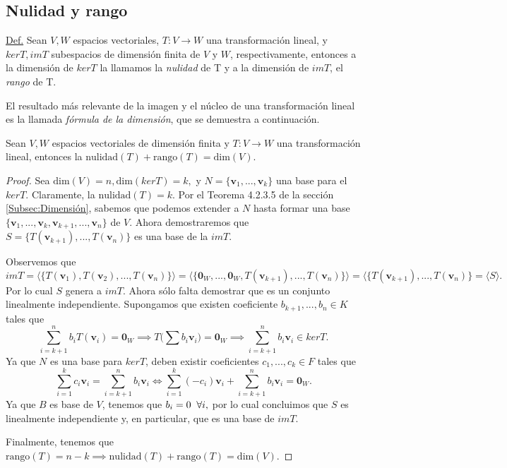 \documentclass[12pt]{article}
\newenvironment{teorema}[2][Teorema]{\begin{trivlist}
\item[\hskip \labelsep {\bfseries #1}\hskip \labelsep {\bfseries #2.}]}{\end{trivlist}}
\begin{document}
\subsection{Nulidad y rango}

\begin{tcolorbox}
    \underline{Def.} Sean $V,W$ espacios vectoriales, $T:V\to W$ una transformación lineal, y $kerT, imT$ subespacios de dimensión finita de $V$ y $W$, respectivamente, entonces a la dimensión de $kerT$ la llamamos la \emph{nulidad} de T y a la dimensión de $imT$, el \emph{rango} de T. 
\end{tcolorbox}

El resultado más relevante de la imagen y el núcleo de una transformación lineal es la llamada \emph{fórmula de la dimensión}, que se demuestra a continuación.

\begin{teorema} {5.3.1}
    Sean $V,W$ espacios vectoriales de dimensión finita y $T:V\to W$ una transformación lineal, entonces la $\text{nulidad}(T)+\text{rango}(T)=\text{dim}(V).$

\begin{proof}
    Sea $\text{dim}(V)=n, \text{dim}(kerT)=k,$ y $N=\{\mathbf{v}_1, ..., \mathbf{v}_k\}$ una base para el $kerT$. Claramente, la $\text{nulidad}(T)=k.$ Por el Teorema 4.2.3.5 de la sección \ref{Subsec:Dimensión}, sabemos que podemos extender a $N$ hasta formar una base $\{\mathbf{v}_1, ..., \mathbf{v}_k, \mathbf{v}_{k+1}, ..., \mathbf{v}_n\}$ de $V$. Ahora demostraremos que $S=\{T(\mathbf{v}_{k+1}), ...,T(\mathbf{v}_n)\}$ es una base de la $imT$.



    Observemos que $$imT=\langle \{T(\mathbf{v}_1),T(\mathbf{v}_2),...,T(\mathbf{v}_n)\} \rangle = \langle \{\mathbf{0}_W,...,\mathbf{0}_W,T(\mathbf{v}_{k+1}),...,T(\mathbf{v}_n)\}\rangle = \langle \{T(\mathbf{v}_{k+1}),...,T(\mathbf{v}_n)\} = \langle S \rangle. $$ \noindent Por lo cual $S$ genera a $imT$. Ahora sólo falta demostrar que es un conjunto linealmente independiente. Supongamos que existen coeficiente $b_{k+1},...,b_n\in K$ tales que \[
        \sum_{i=k+1}^n b_iT(\mathbf{v}_i)=\mathbf{0}_W \implies T\bigg(\sum b_i\mathbf{v}_i \bigg) = \mathbf{0}_W \implies \sum_{i=k+1}^n b_i\mathbf{v}_i \in kerT
    .\] \noindent Ya que $N$ es una base para $kerT$, deben existir coeficientes $c_1,...,c_k\in F$ tales que \[
    \sum_{i=1}^k c_i\mathbf{v}_i = \sum_{i=k+1}^n b_i\mathbf{v}_i \iff \sum_{i=1}^k (-c_i)\mathbf{v}_i + \sum_{i=k+1}^n b_i \mathbf{v}_i = \mathbf{0}_W
    .\] \noindent Ya que $B$ es base de $V$, tenemos que $b_i=0\hspace{2mm} \forall i,$ por lo cual concluimos que $S$ es linealmente independiente y, en particular, que es una base de $imT$.

    Finalmente, tenemos que $\text{rango}(T) = n-k\implies \text{nulidad}(T)+\text{rango}(T)=\text{dim}(V).$
\end{proof}

\end{teorema}
\end{document}
